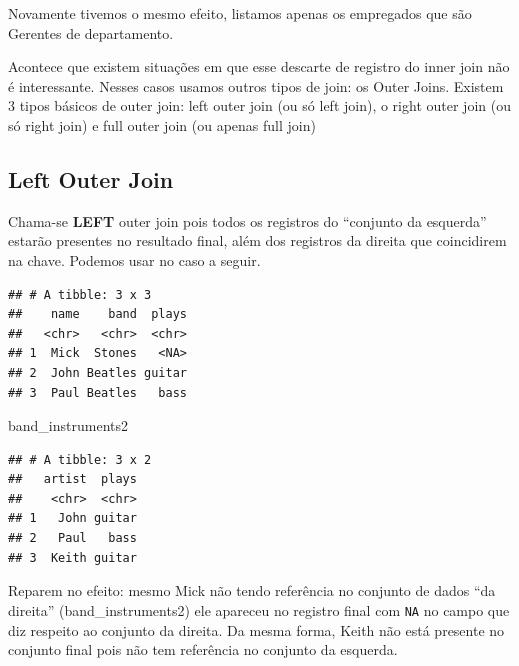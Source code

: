 \documentclass[]{book}
\newenvironment{Shaded}{\begin{snugshade}}{\end{snugshade}}
\newcommand{\KeywordTok}[1]{\textcolor[rgb]{0.13,0.29,0.53}{\textbf{#1}}}
\newcommand{\DataTypeTok}[1]{\textcolor[rgb]{0.13,0.29,0.53}{#1}}
\newcommand{\StringTok}[1]{\textcolor[rgb]{0.31,0.60,0.02}{#1}}
\newcommand{\OperatorTok}[1]{\textcolor[rgb]{0.81,0.36,0.00}{\textbf{#1}}}
\newcommand{\NormalTok}[1]{#1}
\begin{document}
Novamente tivemos o mesmo efeito, listamos apenas os empregados que são
Gerentes de departamento.

Acontece que existem situações em que esse descarte de registro do inner
join não é interessante. Nesses casos usamos outros tipos de join: os
Outer Joins. Existem 3 tipos básicos de outer join: left outer join (ou
só left join), o right outer join (ou só right join) e full outer join
(ou apenas full join)

\subsection{Left Outer Join}\label{left-outer-join}

Chama-se \textbf{LEFT} outer join pois todos os registros do ``conjunto
da esquerda'' estarão presentes no resultado final, além dos registros
da direita que coincidirem na chave. Podemos usar no caso a seguir.

\begin{Shaded}
\end{Shaded}

\begin{verbatim}
## # A tibble: 3 x 3
##    name    band  plays
##   <chr>   <chr>  <chr>
## 1  Mick  Stones   <NA>
## 2  John Beatles guitar
## 3  Paul Beatles   bass
\end{verbatim}

\begin{Shaded}
\begin{Highlighting}[]
\NormalTok{band_instruments2}
\end{Highlighting}
\end{Shaded}

\begin{verbatim}
## # A tibble: 3 x 2
##   artist  plays
##    <chr>  <chr>
## 1   John guitar
## 2   Paul   bass
## 3  Keith guitar
\end{verbatim}

Reparem no efeito: mesmo Mick não tendo referência no conjunto de dados
``da direita'' (band\_instruments2) ele apareceu no registro final com
\texttt{NA} no campo que diz respeito ao conjunto da direita. Da mesma
forma, Keith não está presente no conjunto final pois não tem referência
no conjunto da esquerda.
\end{document}

